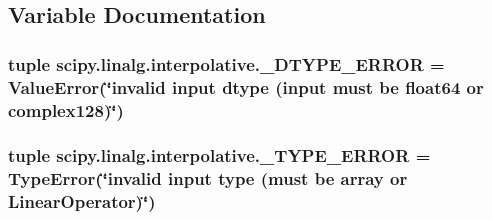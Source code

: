 \subsection{Variable Documentation}
\hypertarget{namespacescipy_1_1linalg_1_1interpolative_a2c56643bfab3d408976b53dc4ba6857f}{}
\subsubsection[{\+\_\+\+D\+T\+Y\+P\+E\+\_\+\+E\+R\+R\+O\+R}]{\setlength{\rightskip}{0pt plus 5cm}tuple scipy.\+linalg.\+interpolative.\+\_\+\+D\+T\+Y\+P\+E\+\_\+\+E\+R\+R\+O\+R = Value\+Error(\char`\"{}invalid {\bf input} dtype ({\bf input} must be float64 or complex128)\char`\"{})}\label{namespacescipy_1_1linalg_1_1interpolative_a2c56643bfab3d408976b53dc4ba6857f}
\hypertarget{namespacescipy_1_1linalg_1_1interpolative_ad59bb08f7183a0e5957d8d528116ce16}{}
\subsubsection[{\+\_\+\+T\+Y\+P\+E\+\_\+\+E\+R\+R\+O\+R}]{\setlength{\rightskip}{0pt plus 5cm}tuple scipy.\+linalg.\+interpolative.\+\_\+\+T\+Y\+P\+E\+\_\+\+E\+R\+R\+O\+R = Type\+Error(\char`\"{}invalid {\bf input} {\bf type} (must be array or Linear\+Operator)\char`\"{})}\label{namespacescipy_1_1linalg_1_1interpolative_ad59bb08f7183a0e5957d8d528116ce16}
